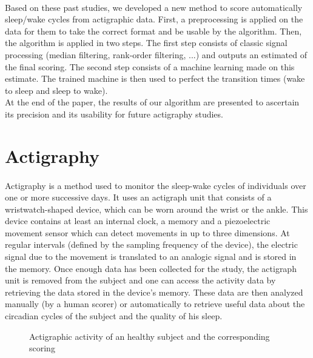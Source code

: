 \documentclass[a4paper,12pt]{article}
\begin{document}
\paragraph{}
Based on these past studies, we developed a new method to score automatically sleep/wake cycles from actigraphic data. First, a preprocessing is applied on the data for them to take the correct format and be usable by the algorithm. Then, the algorithm is applied in two steps. The first step consists of classic signal processing (median filtering, rank-order filtering, ...) and outputs an estimated of the final scoring. The second step consists of a machine learning made on this estimate. The trained machine is then used to perfect the transition times (wake to sleep and sleep to wake). \\
At the end of the paper, the results of our algorithm are presented to ascertain its precision and its usability for future actigraphy studies.

\newpage

\section{Actigraphy}

\paragraph{}
Actigraphy is a method used to monitor the sleep-wake cycles of individuals over one or more successive days. It uses an actigraph unit that consists of a wristwatch-shaped device, which can be worn around the wrist or the ankle. This device contains at least an internal clock, a memory and a piezoelectric movement sensor which can detect movements in up to three dimensions. At regular intervals (defined by the sampling frequency of the device), the electric signal due to the movement is translated to an analogic signal and is stored in the memory. Once enough data has been collected for the study, the actigraph unit is removed from the subject and one can access the activity data by retrieving the data stored in the device's memory. These data are then analyzed manually (by a human scorer) or automatically to retrieve useful data about the circadian cycles of the subject and the quality of his sleep.

\begin{figure}[H]
\centering
{}
\caption{Actigraphic activity of an healthy subject and the corresponding scoring}
\end{figure}
\end{document}

